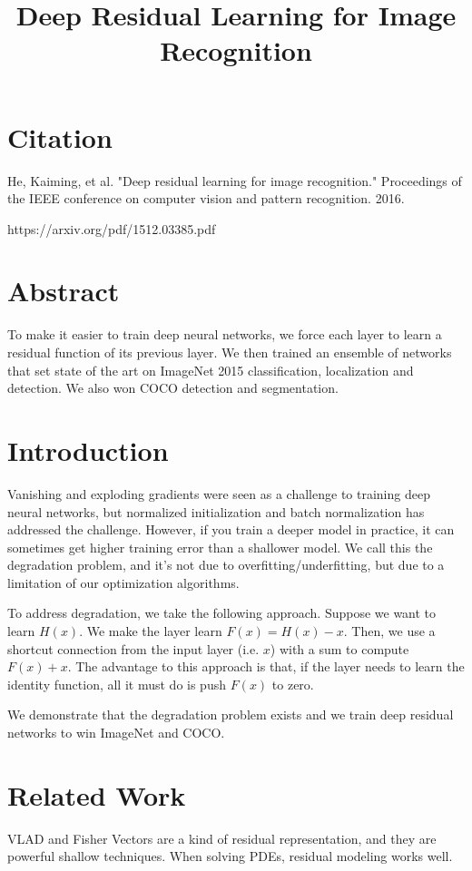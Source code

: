 \documentclass[a4paper]{article}
\title{Deep Residual Learning for Image Recognition}
\date{}
\begin{document}
\maketitle

\section{Citation}

He, Kaiming, et al. "Deep residual learning for image recognition." Proceedings of the IEEE conference on computer vision and pattern recognition. 2016.

https://arxiv.org/pdf/1512.03385.pdf

\section{Abstract}
To make it easier to train deep neural networks, we force each layer to learn
a residual function of its previous layer. We then trained an ensemble of 
networks that set state of the art on ImageNet 2015 classification, localization
and detection. We also won COCO detection and segmentation.

\section{Introduction}
Vanishing and exploding gradients were seen as a challenge to training deep
neural networks, but normalized initialization and batch normalization has
addressed the challenge. However, if you train a deeper model in practice,
it can sometimes get higher training error than a shallower model. We call
this the degradation problem, and it's not due to overfitting/underfitting,
but due to a limitation of our optimization algorithms.

To address degradation, we take the following approach. Suppose we want to learn
$H(x)$. We make the layer learn $F(x) = H(x) - x$. Then, we use a shortcut
connection from the input layer (i.e. $x$) with a sum to compute $F(x) + x$.
The advantage to this approach is that, if the layer needs to learn the 
identity function, all it must do is push $F(x)$ to zero.

We demonstrate that the degradation problem exists and we train deep residual
networks to win ImageNet and COCO.

\section{Related Work}
VLAD and Fisher Vectors are a kind of residual representation, and they are
powerful shallow techniques. When solving PDEs, residual modeling works well.
\end{document}
